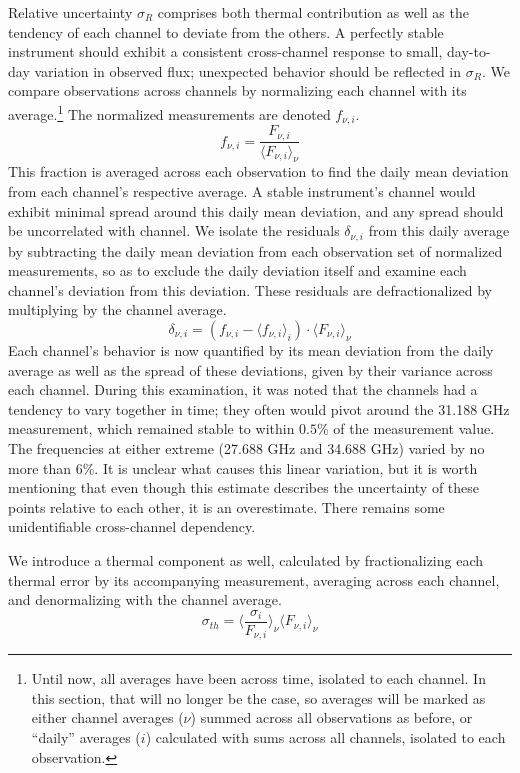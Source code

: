 \documentclass{article}
\begin{document}
	Relative uncertainty $\sigma_{R}$ comprises both thermal contribution as well as the tendency of each channel to deviate from the others.
	A perfectly stable instrument should exhibit a consistent cross-channel response to small, day-to-day variation in observed flux; unexpected behavior should be reflected in $\sigma_{R}$.
	We compare observations across channels by normalizing each channel with its average.\footnote{Until now, all averages have been across time, isolated to each channel.
	In this section, that will no longer be the case, so averages will be marked as either channel averages ($\nu$) summed across all observations as before, or ``daily'' averages ($i$) calculated with sums across all channels, isolated to each observation.}
	The normalized measurements are denoted $f_{\nu, i}$.
	$$ f_{\nu, i} = \frac{F_{\nu, i}}{\langle F_{\nu, i} \rangle_{\nu}} $$
	This fraction is averaged across each observation to find the daily mean deviation from each channel's respective average.
	A stable instrument's channel would exhibit minimal spread around this daily mean deviation, and any spread should be uncorrelated with channel.
	We isolate the residuals $\delta_{\nu, i}$ from this daily average by subtracting the daily mean deviation from each observation set of normalized measurements, so as to exclude the daily deviation itself and examine each channel's deviation from this deviation.
	These residuals are defractionalized by multiplying by the channel average.
	$$ \delta_{\nu, i} = (f_{\nu, i} - \langle f_{\nu, i} \rangle_{i}) \cdot \langle F_{\nu, i} \rangle_{\nu} $$
	Each channel's behavior is now quantified by its mean deviation from the daily average as well as the spread of these deviations, given by their variance across each channel.
	During this examination, it was noted that the channels had a tendency to vary together in time; they often would pivot around the 31.188 GHz measurement, which remained stable to within $0.5$\% of the measurement value.
	The frequencies at either extreme (27.688 GHz and 34.688 GHz) varied by no more than 6\%.
	It is unclear what causes this linear variation, but it is worth mentioning that even though this estimate describes the uncertainty of these points relative to each other, it is an overestimate.
	There remains some unidentifiable cross-channel dependency.

	We introduce a thermal component as well, calculated by fractionalizing each thermal error by its accompanying measurement, averaging across each channel, and denormalizing with the channel average.
	$$\sigma_{th} = \Bigg\langle \frac{\sigma_{i}}{F_{\nu,i}} \Bigg\rangle_{\nu} \langle F_{\nu, i} \rangle_{\nu} $$
\end{document}

